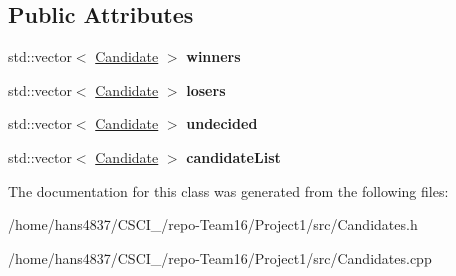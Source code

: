 \subsection*{Public Attributes}
\begin{DoxyCompactItemize}
\item 
\mbox{\label{classCandidates_a524fbccad98042e87cb439ad6a23a121}} 
std\+::vector$<$ \hyperlink{classCandidate}{Candidate} $>$ {\bfseries winners}
\item 
\mbox{\label{classCandidates_afa9e0ea758c1ce3480ce370c81d2f2d5}} 
std\+::vector$<$ \hyperlink{classCandidate}{Candidate} $>$ {\bfseries losers}
\item 
\mbox{\label{classCandidates_a12aafec4ca785542ae4408fbe11c2bd0}} 
std\+::vector$<$ \hyperlink{classCandidate}{Candidate} $>$ {\bfseries undecided}
\item 
\mbox{\label{classCandidates_ac7a165f3d34b29981576e63d94ef9e6e}} 
std\+::vector$<$ \hyperlink{classCandidate}{Candidate} $>$ {\bfseries candidate\+List}
\end{DoxyCompactItemize}


The documentation for this class was generated from the following files\+:\begin{DoxyCompactItemize}
\item 
/home/hans4837/\+C\+S\+C\+I\+\_/repo-\/\+Team16/\+Project1/src/Candidates.\+h\item 
/home/hans4837/\+C\+S\+C\+I\+\_/repo-\/\+Team16/\+Project1/src/Candidates.\+cpp\end{DoxyCompactItemize}
